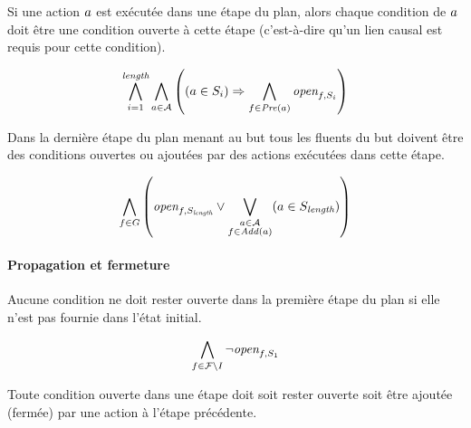 Si une action $a$ est exécutée dans une étape du plan, alors chaque condition de $a$ doit être une condition ouverte à cette étape (c'est-à-dire qu'un lien causal est requis pour cette condition).


\begin{small}
\[
\bigwedge\limits_{\substack{i=1}}^{\textit{length}}\bigwedge\limits_{\substack{\substack{a\in \mathcal{A}}}}\left((a \in S_{i}) \Rightarrow \bigwedge\limits_{\substack{\substack{f\in \mathit{Pre}(a)}}}\textit{open}_{f,S_{i}}\right)
\]
\end{small}

Dans la dernière étape du plan menant au but tous les fluents du but doivent être des conditions ouvertes ou ajoutées par des actions exécutées dans cette étape.


\begin{small}
\[
\bigwedge\limits_{\substack{\substack{f\in G}}}\left(\textit{open}_{f,S_{\textit{length}}} \vee \bigvee\limits_{\substack{\substack{a\in \mathcal{A}\\f \in \mathit{Add}(a)}}}(a \in S_{\textit{length}})\right)
\]
\end{small}

\paragraph*{Propagation et fermeture}

Aucune condition ne doit rester ouverte dans la première étape du plan si elle n'est pas fournie dans l'état initial.


\begin{small}
\[
\bigwedge\limits_{\substack{\substack{f\in \mathcal{F}\setminus I}}}\neg \textit{open}_{f,S_{1}}
\]
\end{small}

Toute condition ouverte dans une étape doit soit rester ouverte soit être ajoutée (fermée) par une action à l'étape précédente.

